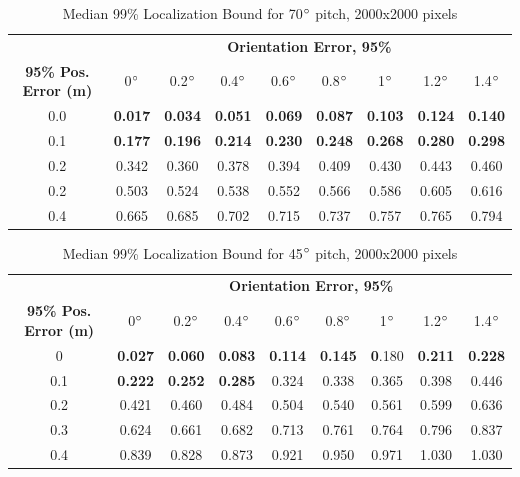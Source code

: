 \documentclass[a4paper,12pt,twoside,openright]{report}
\begin{document}
\begin{table}[htb]
\centering
\caption{Median 99\% Localization Bound for 70$\degree$ pitch, 2000x2000 pixels}
\label{tab:camera:70deg}

\begin{tabular}{ccccccccc}
\toprule
& \multicolumn{8}{c}{\textbf{Orientation Error, 95\%}} \\
\cmidrule(ll){2-9}
\multicolumn{1}{N}{\textbf{95\% Pos. Error (m)}} & 0$\degree$& 0.2$\degree$& 0.4$\degree$ & 0.6$\degree$ & 0.8$\degree$ & 1$\degree$ & 1.2$\degree$ & 1.4$\degree$\\
\cmidrule(lr){1-1}
\cmidrule(ll){2-9}
0.0 & \textbf{0.017} & \textbf{0.034} & \textbf{0.051} & \textbf{0.069} & \textbf{0.087} & \textbf{0.103} & \textbf{0.124} & \textbf{0.140} \\
0.1 & \textbf{0.177} & \textbf{0.196} & \textbf{0.214} & \textbf{0.230} & \textbf{0.248} & \textbf{0.268} & \textbf{0.280} & \textbf{0.298 } \\
0.2 & 0.342 & 0.360 & 0.378 & 0.394 & 0.409 & 0.430 & 0.443 & 0.460  \\
0.2 & 0.503 & 0.524 & 0.538 & 0.552 & 0.566 & 0.586 & 0.605 & 0.616  \\
0.4 & 0.665 & 0.685 & 0.702 & 0.715 & 0.737 & 0.757 & 0.765 & 0.794  \\
\end{tabular} 
\end{table}


\begin{table}[htb]
\centering
\caption{Median 99\% Localization Bound for 45$\degree$ pitch, 2000x2000 pixels}
\label{tab:camera:45deg}

\begin{tabular}{ccccccccc}
\toprule
& \multicolumn{8}{c}{\textbf{Orientation Error, 95\%}} \\
\cmidrule(ll){2-9}
\multicolumn{1}{N}{\textbf{95\% Pos. Error (m)}} & 0$\degree$& 0.2$\degree$& 0.4$\degree$ & 0.6$\degree$ & 0.8$\degree$ & 1$\degree$ & 1.2$\degree$ & 1.4$\degree$\\
\cmidrule(lr){1-1}
\cmidrule(ll){2-9}
0 & \textbf{0.027} & \textbf{0.060} & \textbf{0.083} & \textbf{0.114} & \textbf{0.145} &\textbf{ 0}.180 & \textbf{0.211} & \textbf{0.228} \\
0.1 & \textbf{0.222} & \textbf{0.252} & \textbf{0.285} & 0.324 & 0.338 & 0.365 & 0.398 & 0.446 \\
0.2 & 0.421 & 0.460 & 0.484 & 0.504 & 0.540 & 0.561 & 0.599 & 0.636 \\
0.3 & 0.624 & 0.661 & 0.682 & 0.713 & 0.761 & 0.764 & 0.796 & 0.837 \\
0.4 & 0.839 & 0.828 & 0.873 & 0.921 & 0.950 & 0.971 & 1.030 & 1.030 \\
\end{tabular} 
\end{table}
\begin{tabular}{ccccccccc}
\end{tabular} 
\end{document}
